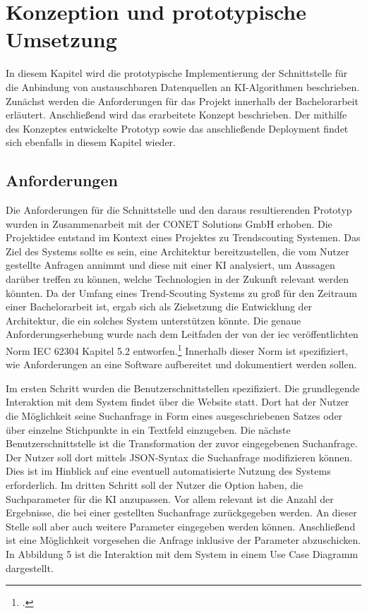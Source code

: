 \section{Konzeption und prototypische Umsetzung}
In diesem Kapitel wird die prototypische Implementierung der Schnittstelle für die Anbindung von austauschbaren Datenquellen an KI-Algorithmen beschrieben. Zunächst werden die Anforderungen für das Projekt innerhalb der Bachelorarbeit erläutert. Anschließend wird das erarbeitete Konzept beschrieben. Der mithilfe des Konzeptes entwickelte Prototyp sowie das anschließende Deployment findet sich ebenfalls in diesem Kapitel wieder.  

\subsection{Anforderungen}
Die Anforderungen für die Schnittstelle und den daraus resultierenden Prototyp wurden in Zusammenarbeit mit der CONET Solutions GmbH erhoben. Die Projektidee entstand im Kontext eines Projektes zu \glqq Trendscouting Systemen\grqq{}. Das Ziel des Systems sollte es sein, eine Architektur bereitzustellen, die vom Nutzer gestellte Anfragen annimmt und diese mit einer KI analysiert, um Aussagen darüber treffen zu können, welche Technologien in der Zukunft relevant werden könnten. Da der Umfang eines Trend-Scouting Systems zu groß für den Zeitraum einer Bachelorarbeit ist, ergab sich als Zielsetzung die Entwicklung der Architektur, die ein solches System unterstützen könnte. Die genaue Anforderungserhebung wurde nach dem Leitfaden der von der \ac{iec} veröffentlichten Norm IEC 62304 Kapitel 5.2 entworfen.\footcite{daniel2018anforderungen} Innerhalb dieser Norm ist spezifiziert, wie Anforderungen an eine Software aufbereitet und dokumentiert werden sollen.

Im ersten Schritt wurden die Benutzerschnittstellen spezifiziert. Die grundlegende Interaktion mit dem System findet über die Website statt. Dort hat der Nutzer die Möglichkeit seine Suchanfrage in Form eines ausgeschriebenen Satzes oder über einzelne Stichpunkte in ein Textfeld einzugeben. Die nächste Benutzerschnittstelle ist die Transformation der zuvor eingegebenen Suchanfrage. Der Nutzer soll dort mittels JSON-Syntax die Suchanfrage modifizieren können. Dies ist im Hinblick auf eine eventuell automatisierte Nutzung des Systems erforderlich. Im dritten Schritt soll der Nutzer die Option haben, die Suchparameter für die KI anzupassen. Vor allem relevant ist die Anzahl der Ergebnisse, die bei einer gestellten Suchanfrage zurückgegeben werden. An dieser Stelle soll aber auch weitere Parameter eingegeben werden können. Anschließend ist eine Möglichkeit vorgesehen die Anfrage inklusive der Parameter abzuschicken. In Abbildung 5 ist die Interaktion mit dem System in einem Use Case Diagramm dargestellt.

